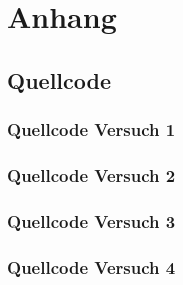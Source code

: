 \documentclass[12pt,oneside,a4paper]{report}
\begin{document}
%
%


%
%


%
%


%
%
%

%
%
\renewcommand\thesection{A.\arabic{section}}
\renewcommand\thesubsection{\thesection.\arabic{subsection}}

\chapter*{Anhang}
\label{chap:APPENDIX}
\addtocounter{chapter}{1}
\setcounter{section}{0}

\section{Quellcode}
\label{chap:APPENDIX_SOURCECODE}

\subsection{Quellcode Versuch 1}
\label{chap:APPENDIX_SOURCECODE_V1}

\subsection{Quellcode Versuch 2}
\label{chap:APPENDIX_SOURCECODE_V2}

\subsection{Quellcode Versuch 3}
\label{chap:APPENDIX_SOURCECODE_V3}

\subsection{Quellcode Versuch 4}
\label{chap:APPENDIX_SOURCECODE_V4}



%
%

\end{document}
